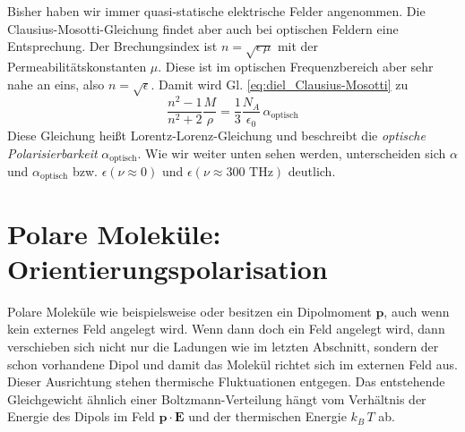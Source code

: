 Bisher haben wir immer quasi-statische elektrische Felder angenommen.  Die Clausius-Mosotti-Gleichung findet aber auch bei optischen Feldern eine Entsprechung. Der Brechungsindex ist $n = \sqrt{\epsilon \, \mu}$ mit der Permeabilitätskonstanten $\mu$. Diese ist im optischen Frequenzbereich aber sehr nahe an eins, also $n = \sqrt{\epsilon }$. Damit wird Gl. \ref{eq:diel_Clausius-Mosotti} zu 
  \begin{equation}
 \frac{n^2 - 1}{n^2 + 2} \frac{M}{\rho} = \frac{1}{3} \frac{N_A}{\epsilon
_0} \, \alpha_\text{optisch} \label{eq:diel_Lorentz_Lorenz}
 \end{equation}
 Diese Gleichung heißt Lorentz-Lorenz-Gleichung und beschreibt die \emph{optische Polarisierbarkeit} $\alpha_\text{optisch}$. Wie wir weiter unten sehen werden, unterscheiden sich $\alpha$ und  $\alpha_\text{optisch}$ bzw. $\epsilon(\nu \approx 0)$ und $\epsilon(\nu \approx 300 \text{ THz})$ deutlich.
 
\section{Polare Moleküle: Orientierungspolarisation}
 
Polare Moleküle wie beispielsweise  oder  besitzen ein Dipolmoment $\mathbf{p}$, auch wenn kein externes Feld angelegt wird. Wenn dann doch ein Feld angelegt wird, dann verschieben sich nicht nur die Ladungen wie im letzten Abschnitt, sondern der schon vorhandene Dipol und damit das Molekül richtet sich im externen Feld aus. Dieser Ausrichtung stehen thermische Fluktuationen entgegen. Das entstehende Gleichgewicht ähnlich einer Boltzmann-Verteilung hängt vom Verhältnis der Energie des Dipols im Feld $\mathbf{p} \cdot \mathbf{E}$ und der thermischen Energie $k_B \, T$ ab. 

